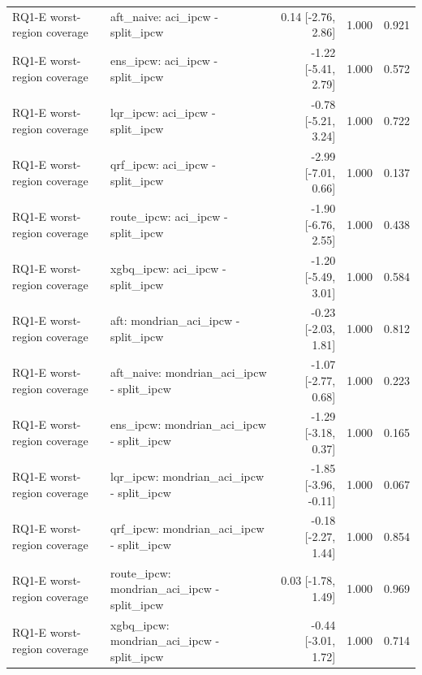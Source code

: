 \begin{table}[!htbp]
\begin{tabular}{llrrr}
RQ1-E worst-region coverage & aft\_naive: aci\_ipcw - split\_ipcw & 0.14 [-2.76, 2.86] & 1.000 & 0.921 \\
RQ1-E worst-region coverage & ens\_ipcw: aci\_ipcw - split\_ipcw & -1.22 [-5.41, 2.79] & 1.000 & 0.572 \\
RQ1-E worst-region coverage & lqr\_ipcw: aci\_ipcw - split\_ipcw & -0.78 [-5.21, 3.24] & 1.000 & 0.722 \\
RQ1-E worst-region coverage & qrf\_ipcw: aci\_ipcw - split\_ipcw & -2.99 [-7.01, 0.66] & 1.000 & 0.137 \\
RQ1-E worst-region coverage & route\_ipcw: aci\_ipcw - split\_ipcw & -1.90 [-6.76, 2.55] & 1.000 & 0.438 \\
RQ1-E worst-region coverage & xgbq\_ipcw: aci\_ipcw - split\_ipcw & -1.20 [-5.49, 3.01] & 1.000 & 0.584 \\
RQ1-E worst-region coverage & aft: mondrian\_aci\_ipcw - split\_ipcw & -0.23 [-2.03, 1.81] & 1.000 & 0.812 \\
RQ1-E worst-region coverage & aft\_naive: mondrian\_aci\_ipcw - split\_ipcw & -1.07 [-2.77, 0.68] & 1.000 & 0.223 \\
RQ1-E worst-region coverage & ens\_ipcw: mondrian\_aci\_ipcw - split\_ipcw & -1.29 [-3.18, 0.37] & 1.000 & 0.165 \\
RQ1-E worst-region coverage & lqr\_ipcw: mondrian\_aci\_ipcw - split\_ipcw & -1.85 [-3.96, -0.11] & 1.000 & 0.067 \\
RQ1-E worst-region coverage & qrf\_ipcw: mondrian\_aci\_ipcw - split\_ipcw & -0.18 [-2.27, 1.44] & 1.000 & 0.854 \\
RQ1-E worst-region coverage & route\_ipcw: mondrian\_aci\_ipcw - split\_ipcw & 0.03 [-1.78, 1.49] & 1.000 & 0.969 \\
RQ1-E worst-region coverage & xgbq\_ipcw: mondrian\_aci\_ipcw - split\_ipcw & -0.44 [-3.01, 1.72] & 1.000 & 0.714 \\
\bottomrule
\end{tabular}
\end{table}
